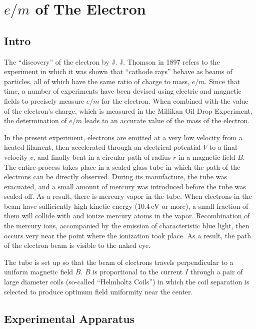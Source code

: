 \chapter{$e/ m$ of The Electron}
\section{Intro}
The ``discovery'' of the electron by J. J. Thomson in 1897 refers to the experiment in which it was shown that ``cathode rays'' behave as beams of particles, all of which have the same ratio of charge to mass, $e/m$. Since that time, a number of experiments have been devised using electric and magnetic fields to precisely measure $e/m$ for the electron. When combined with the value of the electron's charge, which is measured in the Millikan Oil Drop Experiment, the determination of $e/m$ leads to an accurate value of the mass of the electron.\myskip

In the present experiment, electrons are emitted at a very low velocity from a heated filament, then accelerated through an electrical potential $V$ to a final velocity $v$, and finally bent in a circular path of radius $r$ in a magnetic field $B$. The entire process takes place in a sealed glass tube in which the path of the electrons can be directly observed. During its manufacture, the tube was evacuated, and a small amount of mercury was introduced before the tube was sealed off. As a result, there is mercury vapor in the tube. When electrons in the beam have sufficiently high kinetic energy ($10.4\,\mathrm{eV}$ or more), a small fraction of them will collide with and ionize mercury atoms in the vapor. Recombination of the mercury ions, accompanied by the emission of characteristic blue light, then occurs very near the point where the ionization took place. As a result, the path of the electron beam is visible to the naked eye. \myskip

The tube is set up so that the beam of electrons travels perpendicular to a uniform magnetic field $B$. $B$ is proportional to the current $I$ through a pair of large diameter coils (so-called ``Helmholtz Coils'') in which the coil separation is selected to produce optimum field uniformity near the center.

\section{Experimental Apparatus}
